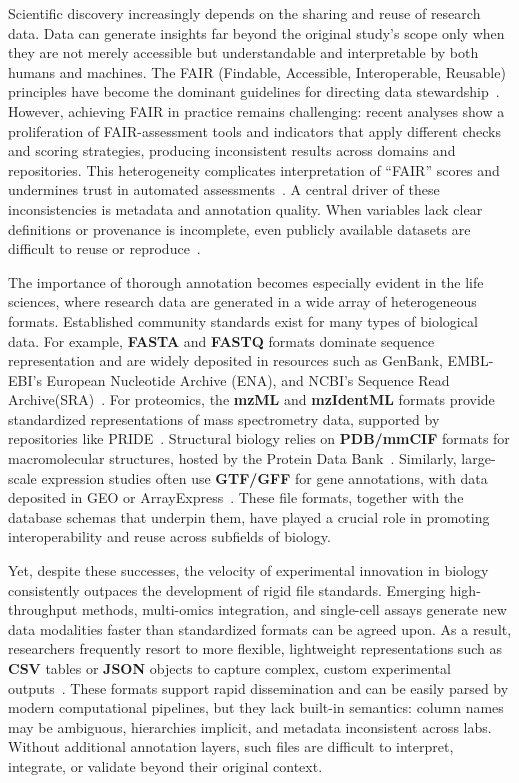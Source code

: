 \documentclass{jib}
\begin{document}
Scientific discovery increasingly depends on the sharing and reuse of research data. Data can generate insights far beyond the original study's scope only when they are not merely accessible but understandable and interpretable by both humans and machines. The FAIR (Findable, Accessible, Interoperable, Reusable) principles have become the dominant guidelines for directing data stewardship~\cite{wilkinson2016fair}. However, achieving FAIR in practice remains challenging: recent analyses show a proliferation of FAIR-assessment tools and indicators that apply different checks and scoring strategies, producing inconsistent results across domains and repositories. This heterogeneity complicates interpretation of “FAIR” scores and undermines trust in automated assessments~\cite{candela2024fair,krans2022automated}. A central driver of these inconsistencies is metadata and annotation quality. When variables lack clear definitions or provenance is incomplete, even publicly available datasets are difficult to reuse or reproduce~\cite{leipzig2021role}. 

The importance of thorough annotation becomes especially evident in the life sciences, where research data are generated in a wide array of heterogeneous formats. Established community standards exist for many types of biological data. For example, \textbf{FASTA} and \textbf{FASTQ} formats dominate sequence representation and are widely deposited in resources such as GenBank, EMBL-EBI’s European Nucleotide Archive (ENA), and NCBI's Sequence Read Archive(SRA)~\cite{cock2010fastq,sayers2024genbank,yuan2024ena,kodama2012sra}. For proteomics, the \textbf{mzML} and \textbf{mzIdentML} formats provide standardized representations of mass spectrometry data, supported by repositories like PRIDE~\cite{perezriverol2025pride}. Structural biology relies on \textbf{PDB/mmCIF} formats for macromolecular structures, hosted by the Protein Data Bank~\cite{wwpdb2019pdb}. Similarly, large-scale expression studies often use \textbf{GTF/GFF} for gene annotations, with data deposited in GEO or ArrayExpress~\cite{barrett2013geo,athar2019arrayexpress}. These file formats, together with the database schemas that underpin them, have played a crucial role in promoting interoperability and reuse across subfields of biology.

Yet, despite these successes, the velocity of experimental innovation in biology consistently outpaces the development of rigid file standards. Emerging high-throughput methods, multi-omics integration, and single-cell assays generate new data modalities faster than standardized formats can be agreed upon. As a result, researchers frequently resort to more flexible, lightweight representations such as \textbf{CSV} tables or \textbf{JSON} objects to capture complex, custom experimental outputs~\cite{tyanova2016maxquant, ewels2016multiqc}. These formats support rapid dissemination and can be easily parsed by modern computational pipelines, but they lack built-in semantics: column names may be ambiguous, hierarchies implicit, and metadata inconsistent across labs. Without additional annotation layers, such files are difficult to interpret, integrate, or validate beyond their original context.  
\end{document}

